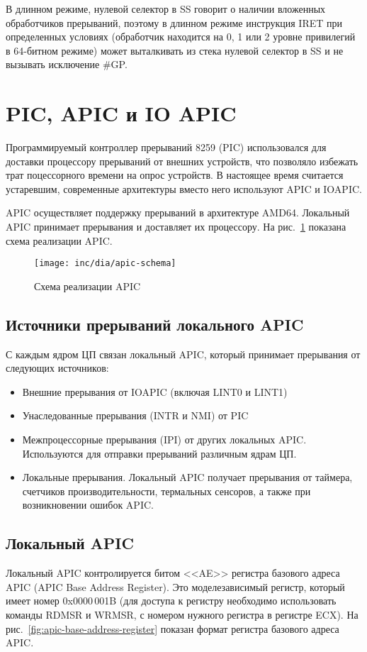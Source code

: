 В длинном режиме, нулевой селектор в SS говорит о наличии вложенных обработчиков прерываний, поэтому
в длинном режиме инструкция IRET при определенных условиях (обработчик находится на 0, 1 или 2 уровне
привилегий в 64-битном режиме) может выталкивать из стека нулевой селектор в SS и не вызывать исключение \#GP.



\section{PIC, APIC и IO APIC}
\label{sec:apic_ioapic}
Программируемый контроллер прерываний 8259 (PIC) использовался для доставки процессору прерываний
от внешних устройств, что позволяло избежать трат поцессорного времени на опрос устройств.
В настоящее время считается устаревшим, современные архитектуры вместо него используют APIC и IOAPIC.

APIC осуществляет поддержку прерываний в архитектуре AMD64. Локальный APIC принимает прерывания и
доставляет их процессору. На рис.~\ref{fig:apic-schema} показана схема реализации APIC.

\begin{figure}[ht!]
  \centering
  \texttt{[image: inc/dia/apic-schema]}
  \caption{Схема реализации APIC}
  \label{fig:apic-schema}
\end{figure}

\subsection{Источники прерываний локального APIC}
С каждым ядром ЦП связан локальный APIC, который принимает прерывания от следующих источников:
\begin{itemize}
	\item Внешние прерывания от IOAPIC (включая LINT0 и LINT1)
	\item Унаследованные прерывания (INTR и NMI) от PIC
	\item Межпроцессорные прерывания (IPI) от других локальных APIC. Используются
		для отправки прерываний различным ядрам ЦП.
	\item Локальные прерывания. Локальный APIC получает прерывания от таймера,
		счетчиков производительности, термальных сенсоров, а также при возникновении
		ошибок APIC.
\end{itemize}

\subsection{Локальный APIC}
Локальный APIC контролируется битом <<AE>> регистра базового адреса APIC (APIC Base Address Register).
Это моделезависимый регистр, который имеет номер 0x0000\,001B (для доступа к регистру необходимо
использовать команды RDMSR и WRMSR, с номером нужного регистра в регистре ECX).
На рис.~\ref{fig:apic-base-address-register} показан формат регистра базового адреса APIC.

